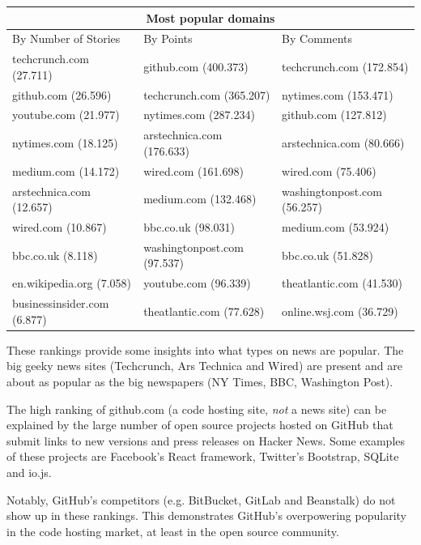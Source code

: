 \begin{center}
    \begin{tabular}{|p{4.5cm}|p{=5cm}|p{5cm}|}
       \hline
       \multicolumn{3}{|c|}{Most popular domains} \\
       \hline
       By Number of Stories 			& By Points 									& By Comments \\
       \hline
       techcrunch.com (27.711) 	& github.com (400.373)		       & techcrunch.com (172.854) \\
		github.com (26.596) 			& techcrunch.com (365.207) 	   & nytimes.com (153.471) \\
		youtube.com (21.977) 		& nytimes.com (287.234)		   & github.com (127.812) \\
		nytimes.com (18.125) 		& arstechnica.com (176.633)	   & arstechnica.com (80.666) \\
		medium.com (14.172) 		& wired.com (161.698)		  	   & wired.com (75.406) \\
		arstechnica.com (12.657) 	& medium.com (132.468)		   & washingtonpost.com (56.257) \\
		wired.com (10.867) 			& bbc.co.uk (98.031)		  		   & medium.com (53.924) \\
		bbc.co.uk (8.118) 				& washingtonpost.com (97.537) & bbc.co.uk (51.828) \\
		en.wikipedia.org (7.058) 		& youtube.com (96.339)		  	   & theatlantic.com (41.530) \\
		businessinsider.com (6.877) & theatlantic.com (77.628)	   & online.wsj.com (36.729) \\
        \hline
    \end{tabular}
\end{center}

These rankings provide some insights into what types on news are popular. The big geeky news sites (Techcrunch, Ars Technica and Wired) are present and are about as popular as the big newspapers (NY Times, BBC, Washington Post). 

The high ranking of github.com (a code hosting site, \textit{not} a news site) can be explained by the large number of open source projects hosted on GitHub that submit links to new versions and press releases on Hacker News. Some examples of these projects are Facebook's React framework, Twitter's Bootstrap, SQLite and io.js. 

Notably, GitHub's competitors (e.g. BitBucket, GitLab and Beanstalk) do not show up in these rankings. This demonstrates GitHub's overpowering popularity in the code hosting market, at least in the open source community.

